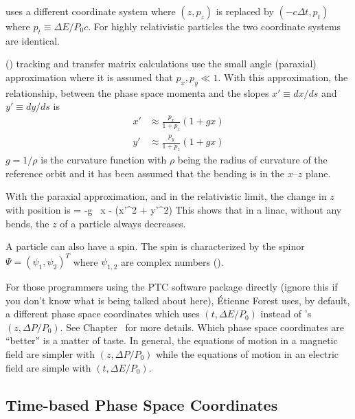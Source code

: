 \mad uses a different coordinate system where $(z, p_z)$ is
replaced by $(-c\Delta t, p_t)$ where $p_t \equiv \Delta E / P_0
c$. For highly relativistic particles the two coordinate systems are
identical.

 () tracking and transfer matrix
calculations use the small angle (paraxial) approximation where it is
assumed that $p_x, p_y \ll 1$. With this approximation, the
relationship, between the phase space momenta and the slopes $x' \equiv
dx/ds$ and $y' \equiv dy/ds$ is
\begin{align}
  x' &\approx \frac{p_x}{1 + p_z} (1 + g x) \\
  y' &\approx \frac{p_y}{1 + p_z} (1 + g x) 
  \label{xpa1p}
\end{align}
$g = 1/\rho$ is the curvature function with $\rho$ being the radius of
curvature of the reference orbit and it has been assumed that the
bending is in the $x$--$z$ plane. 

With the paraxial approximation, and in the relativistic limit, the
change in $z$ with position is
\Begineq
   = -g \, x -  (x'^2 + y'^2)
\Endeq
This shows that in a linac, without any bends, the $z$ of a particle
always decreases.

A particle can also have a spin. The spin is characterized by the
spinor $\Psi = \left( \psi_{1}, \psi_{2} \right)^{T}$ where
$\psi_{1,2}$ are complex numbers ().

For those programmers using the PTC software package
directly (ignore this if you don't know what is being talked about
here), \'Etienne Forest uses, by default, a different phase space
coordinates which uses $(t, \Delta E/P_0)$ instead of \bmad's $(z,
\Delta P/P_0)$. See Chapter~ for more details. Which phase
space coordinates are ``better'' is a matter of taste. In general, the
equations of motion in a magnetic field are simpler with $(z, \Delta
P/P_0)$ while the equations of motion in an electric field are simple
with $(t, \Delta E/P_0)$.

\subsection{Time-based Phase Space Coordinates}
\label{s:time.phase.space}

